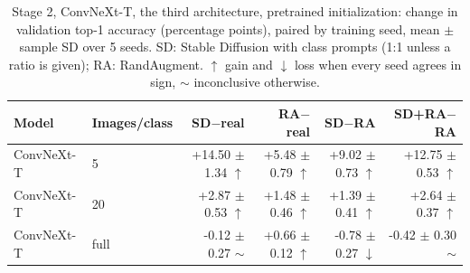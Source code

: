 \begin{table}[H]
\centering
\small
\setlength{\tabcolsep}{4pt}
\caption{Stage 2, ConvNeXt-T, the third architecture, pretrained initialization: change in validation top-1 accuracy (percentage points), paired by training seed, mean $\pm$ sample SD over 5 seeds. SD: Stable Diffusion with class prompts (1:1 unless a ratio is given); RA: RandAugment. $\uparrow$ gain and $\downarrow$ loss when every seed agrees in sign, $\sim$ inconclusive otherwise.}
\label{tab:stage2-convnext-pretrained}
\begin{tabular}{llrrrr}
\toprule
Model & Images/class & SD$-$real & RA$-$real & SD$-$RA & SD+RA$-$RA \\
\midrule
ConvNeXt-T & 5 & +14.50 $\pm$ 1.34 $\uparrow$ & +5.48 $\pm$ 0.79 $\uparrow$ & +9.02 $\pm$ 0.73 $\uparrow$ & +12.75 $\pm$ 0.53 $\uparrow$ \\
ConvNeXt-T & 20 & +2.87 $\pm$ 0.53 $\uparrow$ & +1.48 $\pm$ 0.46 $\uparrow$ & +1.39 $\pm$ 0.41 $\uparrow$ & +2.64 $\pm$ 0.37 $\uparrow$ \\
ConvNeXt-T & full & -0.12 $\pm$ 0.27 $\sim$ & +0.66 $\pm$ 0.12 $\uparrow$ & -0.78 $\pm$ 0.27 $\downarrow$ & -0.42 $\pm$ 0.30 $\sim$ \\
\bottomrule
\end{tabular}
\end{table}

